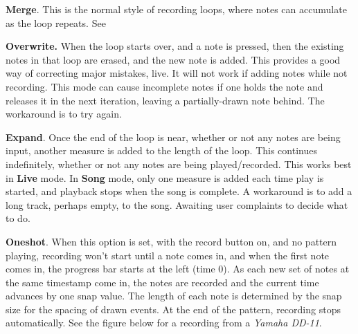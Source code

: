    \begin{enumber}
      \item \textbf{Merge}.
         This is the normal style of recording loops, where notes can
         accumulate as the loop repeats.
         See 
      \item \textbf{Overwrite.}
         When the loop starts over, and a note is pressed,
         then the existing notes in that loop are erased,
         and the new note is added.
         This provides a good way of correcting major mistakes, live.
         It will not work if adding notes while not recording.
         This mode can cause incomplete notes if one
         holds the note and releases it in the next iteration, leaving a
         partially-drawn note behind.  The workaround is to try again.
      \item \textbf{Expand}.
         Once the end of the loop is near, whether or
         not any notes are being input, another measure is added to the length
         of the loop.
         This continues indefinitely, whether or not any notes are
         being played/recorded.
         This works best in \textbf{Live} mode.
         In \textbf{Song} mode, only one measure is added each time play is
         started, and playback stops when the song is complete.
         A workaround is to add a long track, perhaps empty, to the song.
         Awaiting user complaints to decide what to do.
      \item \textbf{Oneshot}.
         When this option is set, with the record button on, and no pattern
         playing, recording won't start until a note comes in, and when the
         first note comes in, the progress bar starts at the left (time 0).
         As each new set of notes at the same timestamp come in, the
         notes are recorded and the current time advances by one snap value.
         The length of each note is determined by the snap size for the spacing
         of drawn events.
         At the end of the pattern, recording stops automatically.
         See the figure
         below for a recording from a \textsl{Yamaha DD-11}.
   \end{enumber}

